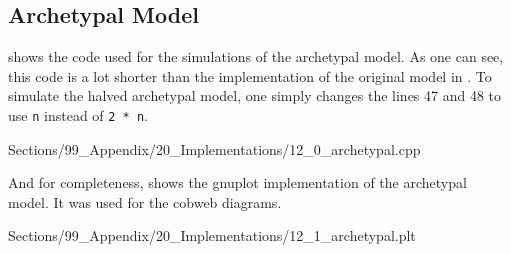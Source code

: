 \subsection{Archetypal Model}
\label{app:impl.model.arch}

 shows the code used for the simulations of the archetypal model.
As one can see, this code is a lot shorter than the implementation of the original model in .
To simulate the halved archetypal model, one simply changes the lines 47 and 48 to use \texttt{n} instead of \texttt{2 * n}.


{Sections/99_Appendix/20_Implementations/12_0_archetypal.cpp}

\clearpage
And for completeness,  shows the gnuplot implementation of the archetypal model.
It was used for the cobweb diagrams.


{Sections/99_Appendix/20_Implementations/12_1_archetypal.plt}
